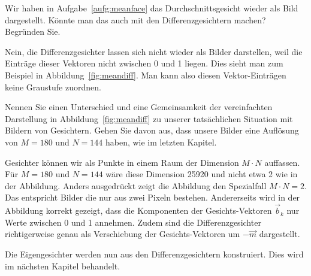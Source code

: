 \begin{aufgabe} \label{aufg:difffaces_images}
	Wir haben in Aufgabe~\ref{aufg:meanface} das Durchschnittsgesicht wieder als Bild dargestellt.
	Könnte man das auch mit den Differenzgesichtern machen?
	Begründen Sie.
\end{aufgabe}
\begin{losung}
	Nein, die Differenzgesichter lassen sich nicht wieder als Bilder darstellen, weil die Einträge dieser Vektoren nicht zwischen 0 und 1 liegen.
	Dies sieht man zum Beispiel in Abbildung~\ref{fig:meandiff}.
	Man kann also diesen Vektor-Einträgen keine Graustufe zuordnen.
\end{losung}
\begin{aufgabe} \label{aufg:hmmc}
	Nennen Sie einen Unterschied und eine Gemeinsamkeit der vereinfachten Darstellung in Abbildung~\ref{fig:meandiff} zu unserer tatsächlichen Situation mit Bildern von Gesichtern.
	Gehen Sie davon aus, dass unsere Bilder eine Auflösung von $M=180$ und $N=144$ haben, wie im letzten Kapitel.
\end{aufgabe}
\begin{losung}
	Gesichter können wir als Punkte in einem Raum der Dimension $M\cdot N$ auffassen.
	Für $M=180$ und $N=144$ wäre diese Dimension 25920 und nicht etwa 2 wie in der Abbildung.
	Anders ausgedrückt zeigt die Abbildung den Spezialfall $M\cdot N=2$.
	Das entspricht Bilder die nur aus zwei Pixeln bestehen.
	Andererseits wird in der Abbildung korrekt gezeigt, dass die Komponenten der Gesichts-Vektoren $\vec b_k$ nur Werte zwischen 0 und 1 annehmen.
	Zudem sind die Differenzgesichter richtigerweise genau als Verschiebung der Gesichts-Vektoren um $-\vec m$ dargestellt.
\end{losung}
Die Eigengesichter werden nun aus den Differenzgesichtern konstruiert.
Dies wird im nächsten Kapitel behandelt.
%
%
